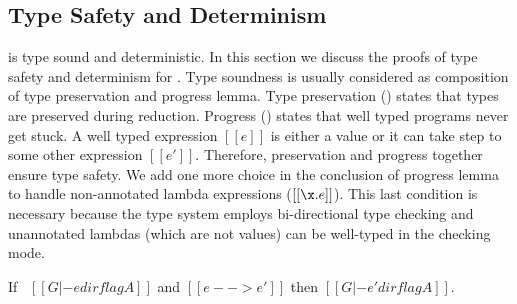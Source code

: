 \subsection{Type Safety and Determinism}
\label{sec:union:safety}
\cal is type sound and deterministic. In this section we discuss the
proofs of type safety and determinism for \cal. Type soundness is usually
considered as composition of type preservation and progress
lemma. Type preservation () states that
types are preserved during reduction. Progress
() states that well typed programs never get
stuck.  A well typed expression $[[e]]$ is either a value or it can
take step to some other expression $[[e']]$. Therefore, preservation and progress
together ensure type safety.  We add one more choice in the conclusion
of progress lemma to handle non-annotated lambda expressions
($[[\x.e]]$). This last condition is necessary because the type system
employs bi-directional type checking and unannotated lambdas (which are not values)
can be well-typed in the checking mode.

\begin{lemma}
\label{lemma:union:preservation}
  If \ $[[G |- e dirflag A]]$ and $[[e --> e']]$ then $[[G |- e' dirflag A]]$.
\end{lemma}

\begin{comment}
\begin{proof}
  By induction on typing relation and subsequent inverting reduction relation.
  \begin{itemize}
    \item Cases \rref{typ-int, typ-var, typ-sub, typ-abs} are trivial to prove.
    \item Case \rref{typ-ann} requires helping \cref{lemma:union:check-pexpr-ann}.
    \item Case \rref{typ-app} requires helping \cref{lemma:union:pexpr-check-sub}
          and substitution \cref{lemma:union:substitution} for beta reduction.
    \item Case \rref{typ-typeof} requires substitution \cref{lemma:union:substitution}.
  \end{itemize}
\end{proof}

\baber{ToDo: change name of helping lemmas.}

\begin{lemma}[check-pexpr-ann]
\label{lemma:union:check-pexpr-ann}
  If \ $[[G |- p:C <= A]]$ \ then \ $[[G |- p <= A]]$.
\end{lemma}

\begin{lemma}[pexpr-check-sub]
\label{lemma:union:pexpr-check-sub}
  If \ $[[G |- p <= A]]$ \ and \ $[[A <: B]]$ \ then \ $[[G |- p <= B]]$.
\end{lemma}
\end{comment}


